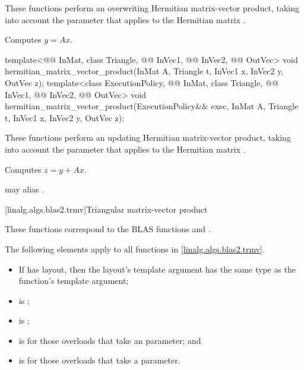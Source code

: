 \begin{itemdescr}
\pnum
These functions perform an overwriting Hermitian matrix-vector product,
taking into account the  parameter
that applies to the Hermitian matrix .

\pnum
\effects
Computes $y = A x$.
\end{itemdescr}

%
\begin{itemdecl}
template<@@ InMat, class Triangle, @@ InVec1, @@ InVec2, @@ OutVec>
  void hermitian_matrix_vector_product(InMat A, Triangle t, InVec1 x, InVec2 y, OutVec z);
template<class ExecutionPolicy,
         @@ InMat, class Triangle, @@ InVec1, @@ InVec2, @@ OutVec>
  void hermitian_matrix_vector_product(ExecutionPolicy&& exec,
                                       InMat A, Triangle t, InVec1 x, InVec2 y, OutVec z);
\end{itemdecl}

\begin{itemdescr}
\pnum
These functions perform an updating Hermitian matrix-vector product,
taking into account the  parameter
that applies to the Hermitian matrix .

\pnum
\effects
Computes $z = y + A x$.

\pnum
\remarks
{} may alias .
\end{itemdescr}

[linalg.algs.blas2.trmv]{Triangular matrix-vector product}

\pnum
\begin{note}
These functions correspond to the BLAS functions
 and \supercite{blas2}.
\end{note}

\pnum
The following elements apply to all functions in \ref{linalg.algs.blas2.trmv}.

\pnum
\mandates
\begin{itemize}
\item
If  has  layout,
then the layout's  template argument has
the same type as the function's  template argument;
\item
{}
is ;
\item
{}
is ;
\item
{}
is  for those overloads that take an  parameter; and
\item
{}
is  for those overloads that take a  parameter.
\end{itemize}

